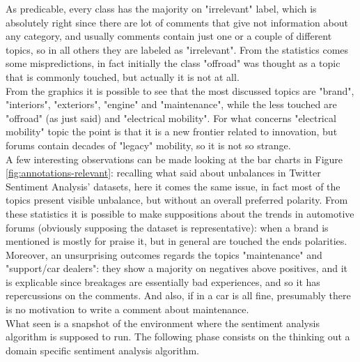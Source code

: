 As predicable, every class has the majority on "irrelevant" label, which is absolutely right since there are lot of comments that give not information about any category, and usually comments contain just one or a couple of different topics, so in all others they are labeled as "irrelevant". From the statistics comes some mispredictions, in fact initially the class "offroad" was thought as a topic that is commonly touched, but actually it is not at all. \\
From the graphics it is possible to see that the most discussed topics are "brand", "interiors", "exteriors", "engine" and "maintenance", while the less touched are "offroad" (as just said) and "electrical mobility". For what concerns "electrical mobility" topic the point is that it is a new frontier related to innovation, but forums contain decades of "legacy" mobility, so it is not so strange.\\
A few interesting observations can be made looking at the bar charts in Figure \ref{fig:annotations-relevant}: recalling what said about unbalances in Twitter Sentiment Analysis' datasets, here it comes the same issue, in fact most of the topics present visible unbalance, but without an overall preferred polarity. From these statistics it is possible to make suppositions about the trends in automotive forums (obviously supposing the dataset is representative): when a brand is mentioned is mostly for praise it, but in general are touched the ends polarities. Moreover, an unsurprising outcomes regards the topics "maintenance" and "support/car dealers": they show a majority on negatives above positives, and it is explicable since breakages are essentially bad experiences, and so it has repercussions on the comments. And also, if in a car is all fine, presumably there is no motivation to write a comment about maintenance.\\

What seen is a snapshot of the environment where the sentiment analysis algorithm is supposed to run. The following phase consists on the thinking out a domain specific sentiment analysis algorithm.




























